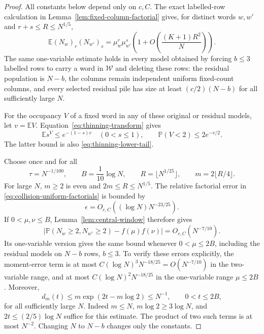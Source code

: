 \documentclass[11pt]{article}
\numberwithin{equation}{section}
\theoremstyle{definition}
\theoremstyle{remark}
\newcommand{\E}{\mathbb E}
\newcommand{\Pp}{\mathbb P}
\newcommand{\1}{\mathbf 1}
\begin{document}
\begin{proof}
All constants below depend only on $c,C$. The exact labelled-row calculation
in Lemma~\ref{lem:fixed-column-factorial} gives, for distinct words $w,w'$
and $r+s\le R\le N^{1/5}$,
\begin{equation}
\label{eq:collision-uniform-factorials}
 \E(N_w)_r(N_{w'})_s
 =\mu_w^r\mu_{w'}^s\left(1+O\left(\frac{(K+1)R^2}{N}\right)\right).
\end{equation}
The same one-variable estimate holds in every model obtained by forcing
$b\le3$ labelled rows to carry a word in $\mathcal W$ and deleting these
rows: the residual population is $N-b$, the columns remain independent
uniform fixed-count columns, and every selected residual pile has size at
least $(c/2)(N-b)$ for all sufficiently large $N$.

For the occupancy $V$ of a fixed word in any of these original or residual
models, let $v=\E V$. Equation~\eqref{eq:thinning-transform} gives
\begin{equation}
\label{eq:collision-empty-singleton-tail}
 \E s^V\le e^{-(1-s)v}\quad(0<s\le1),\qquad
 \Pp(V<2)\le2e^{-v/2}.
\end{equation}
The latter bound is also \eqref{eq:thinning-lower-tail}.

Choose once and for all
\[
 \tau=N^{-1/100},\qquad B=\frac1{10}\log N,
 \qquad R=\lfloor N^{1/25}\rfloor,
 \qquad m=2\lfloor R/4\rfloor.
\]
For large $N$, $m\ge2$ is even and $2m\le R\le N^{1/5}$.
The relative factorial error in \eqref{eq:collision-uniform-factorials}
is bounded by
\[
 \epsilon=O_{c,C}((\log N)N^{-23/25}).
\]
If $0<\mu,\nu\le B$, Lemma~\ref{lem:central-window} therefore gives
\begin{equation}
\label{eq:collision-central-absolute}
 \left|\Pp(N_w\ge2,N_{w'}\ge2)-f(\mu)f(\nu)\right|
 =O_{c,C}(N^{-7/10}).
\end{equation}
Its one-variable version gives the same bound whenever $0<\mu\le2B$,
including the residual models on $N-b$ rows, $b\le3$.
To verify these errors explicitly, the moment-error term is at most
$C(\log N)^3N^{-18/25}=O(N^{-7/10})$ in the two-variable range,
and at most $C(\log N)^2N^{-18/25}$ in the one-variable range $\mu\le2B$.
Moreover,
\[
 d_m(t)\le m\exp(2t-m\log2)\le N^{-1},\qquad 0<t\le2B,
\]
for all sufficiently large $N$. Indeed $m\le N$, $m\log2\ge3\log N$, and $2t\le(2/5)\log N$ suffice for this estimate. The product of two such terms is at most $N^{-2}$. Changing $N$ to $N-b$ changes only the constants.


\end{proof}
\end{document}
